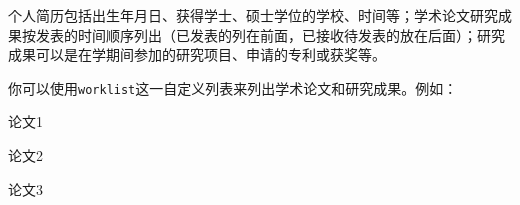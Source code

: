 \begin{resume}
    个人简历包括出生年月日、获得学士、硕士学位的学校、时间等；学术论文研究成果按发表的时间顺序列出（已发表的列在前面，已接收待发表的放在后面）；研究成果可以是在学期间参加的研究项目、申请的专利或获奖等。

    你可以使用\texttt{worklist}这一自定义列表来列出学术论文和研究成果。例如：
    \begin{worklist}
        \item 论文1
        \item 论文2
        \item 论文3
    \end{worklist}
\end{resume}

